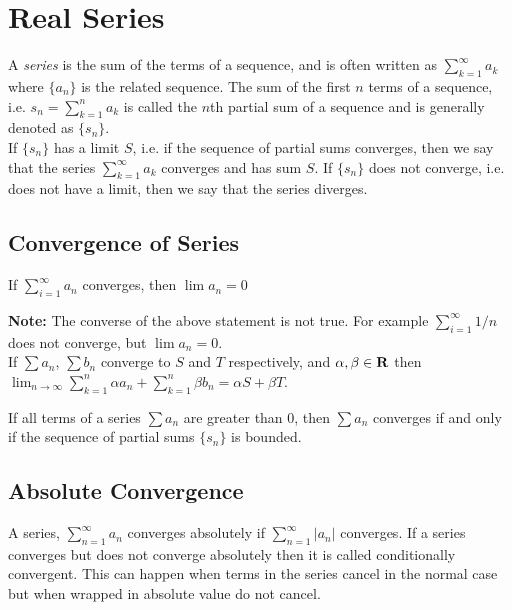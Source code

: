 \section{Real Series}
  A \emph{series} is the sum of the terms of a sequence, and is often written as 
  $\sum_{k=1}^{\infty} a_k$ where $\{a_n\}$ is the related sequence. The sum of the
  first $n$ terms of a sequence, i.e. $s_n = \sum_{k=1}^n a_k$ is called the $n$th partial sum 
  of a sequence and is generally denoted as $\{s_n\}$.\\
  
  If $\{s_n\}$ has a limit $S$, i.e. if the sequence of partial sums converges, then we say 
  that the series $\sum_{k=1}^{\infty} a_k$ converges and has sum $S$. If $\{s_n\}$ does 
  not converge, i.e. does not have a limit, then we say that the series diverges.
  
  \subsection{Convergence of Series}
    \thm If $\sum_{i=1}^{\infty} a_n$ converges, then $\lim a_n = 0$\\

    \pf {}

    \textbf{Note:} The converse of the above statement is not true. For example 
    $\sum_{i=1}^{\infty} 1/n$ does not converge, but $\lim a_n =0$.\\
 
    \thm If $\sum a_n$, $\sum b_n$ converge to $S$ and $T$ respectively, and $\alpha, \beta \in 
    \mathbf{R}$ then $\lim_{n \to \infty} \sum_{k=1}^n \alpha a_n + \sum_{k=1}^n \beta b_n = \alpha 
    S + \beta T$.\\

    \pf {}

    \thm If all terms of a series $\sum a_n$ are greater than 0, then $\sum a_n$ converges
    if and only if the sequence of partial sums $\{s_n\}$ is bounded.\\

    \pf {}
 
  \subsection{Absolute Convergence}
    A series, $\sum_{n=1}^{\infty} a_n$ converges absolutely if $\sum_{n=1}^{\infty} |a_n|$ 
    converges. If a series converges but does not converge absolutely then it is called 
    conditionally convergent. This can happen when terms in the series cancel in the normal case
    but when wrapped in absolute value do not cancel.\\

